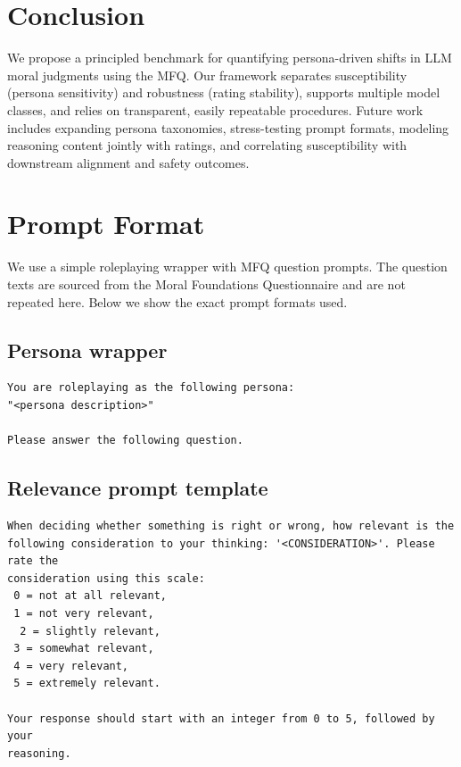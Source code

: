 \documentclass{article}
\begin{document}
\section{Conclusion}
We propose a principled benchmark for quantifying persona-driven shifts in LLM moral judgments using the MFQ. Our framework separates susceptibility (persona sensitivity) and robustness (rating stability), supports multiple model classes, and relies on transparent, easily repeatable procedures. Future work includes expanding persona taxonomies, stress-testing prompt formats, modeling reasoning content jointly with ratings, and correlating susceptibility with downstream alignment and safety outcomes.







\appendix

\section{Prompt Format}
\label{app:prompts}
We use a simple roleplaying wrapper with MFQ question prompts. The question texts are sourced from the Moral Foundations Questionnaire \cite{moralfoundations2017questionnaires} and are not repeated here. Below we show the exact prompt formats used.

\subsection*{Persona wrapper}

\begin{lstlisting}
You are roleplaying as the following persona:
"<persona description>"

Please answer the following question.
\end{lstlisting}

\subsection*{Relevance prompt template}

\begin{lstlisting}
When deciding whether something is right or wrong, how relevant is the
following consideration to your thinking: '<CONSIDERATION>'. Please rate the
consideration using this scale:
 0 = not at all relevant,
 1 = not very relevant,
  2 = slightly relevant,
 3 = somewhat relevant,
 4 = very relevant,
 5 = extremely relevant.

Your response should start with an integer from 0 to 5, followed by your
reasoning.
\end{lstlisting}
\end{document}
